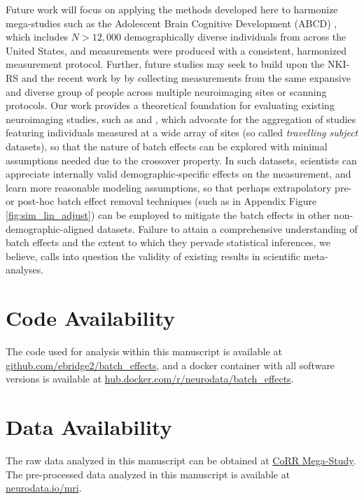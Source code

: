 {Future work will focus on applying the methods developed here to harmonize mega-studies such as the Adolescent Brain Cognitive Development (ABCD) \cite{Karcher2021Jan}, which includes $N>12,000$ demographically diverse individuals from across the United States, and measurements were produced with a consistent, harmonized measurement protocol. Further, future studies may seek to build upon the NKI-RS and the recent work by \citet{Noble2017Feb} by collecting measurements from the same expansive and diverse group of people across multiple neuroimaging sites or scanning protocols. Our work provides a theoretical foundation for evaluating existing neuroimaging studies, such as \citet{Noble2017Feb} and \cite{Yamashita2019Apr}, which advocate for the aggregation of studies featuring individuals measured at a wide array of sites (so called \textit{travelling subject} datasets), so that the nature of batch effects can be explored with minimal assumptions needed due to the crossover property. In such datasets, scientists can appreciate internally valid demographic-specific effects on the measurement, and learn more reasonable modeling assumptions, so that perhaps extrapolatory pre- or post-hoc batch effect removal techniques (such as in Appendix Figure \ref{fig:sim_lin_adjust}) can be employed to mitigate the batch effects in other non-demographic-aligned datasets. Failure to attain a comprehensive understanding of batch effects and the extent to which they pervade statistical inferences, we believe, calls into question the validity of existing results in scientific meta-analyses. 

\section*{Code Availability}

The code used for analysis within this manuscript is available at \\ \href{https://github.com/ebridge2/batch_effects}{github.com/ebridge2/batch\_effects}, and a docker container with all software versions is available at \href{https://hub.docker.com/r/neurodata/batch_effects}{hub.docker.com/r/neurodata/batch\_effects}.

\section*{Data Availability}

The raw data analyzed in this manuscript can be obtained at \href{http://fcon_1000.projects.nitrc.org/indi/CoRR/html/}{CoRR Mega-Study}. The pre-processed data analyzed in this manuscript is available at \href{https://neurodata.io/mri/}{neurodata.io/mri}.

}
